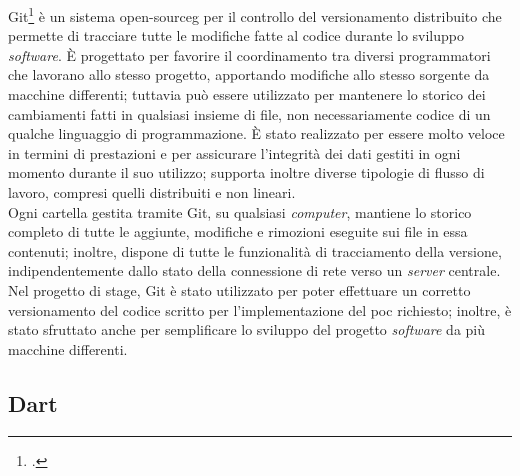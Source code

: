 Git\footcite{site:git} è un sistema \gls{open-sourceg} per il controllo del versionamento distribuito che permette di tracciare tutte le modifiche fatte al codice durante lo sviluppo \textit{software}. È progettato per favorire il coordinamento tra diversi programmatori che lavorano allo stesso progetto, apportando modifiche allo stesso sorgente da macchine differenti; tuttavia può essere utilizzato per mantenere lo storico dei cambiamenti fatti in qualsiasi insieme di file, non necessariamente codice di un qualche linguaggio di programmazione. È stato realizzato per essere molto veloce in termini di prestazioni e per assicurare l'integrità dei dati gestiti in ogni momento durante il suo utilizzo; supporta inoltre diverse tipologie di flusso di lavoro, compresi quelli distribuiti e non lineari.\\
Ogni cartella gestita tramite Git, su qualsiasi \textit{computer}, mantiene lo storico completo di tutte le aggiunte, modifiche e rimozioni eseguite sui file in essa contenuti; inoltre, dispone di tutte le funzionalità di tracciamento della versione, indipendentemente dallo stato della connessione di rete verso un \textit{server} centrale.\\
Nel progetto di stage, Git è stato utilizzato per poter effettuare un corretto versionamento del codice scritto per l'implementazione del \gls{poc} richiesto; inoltre, è stato sfruttato anche per semplificare lo sviluppo del progetto \textit{software} da più macchine differenti.

\subsection{Dart}

